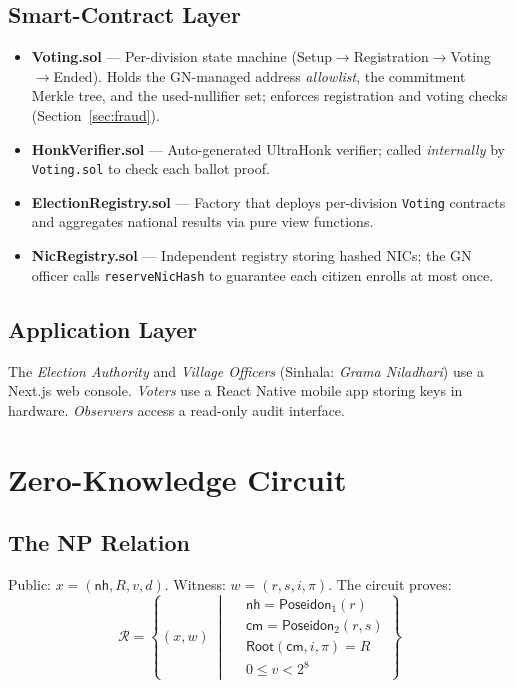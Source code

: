 \documentclass[conference]{IEEEtran}
\theoremstyle{definition}
\theoremstyle{plain}
\newcommand{\Poseidon}{\mathsf{Poseidon}}
\newcommand{\nullhash}{\mathsf{nh}}
\newcommand{\commit}{\mathsf{cm}}
\begin{document}
\subsection{Smart-Contract Layer}
\begin{itemize}[leftmargin=*,itemsep=2pt,topsep=3pt]
\item \textbf{Voting.sol} --- Per-division state machine (Setup$\to$Registration$\to$Voting$\to$Ended). Holds the GN-managed address \emph{allowlist}, the commitment Merkle tree, and the used-nullifier set; enforces registration and voting checks (Section~\ref{sec:fraud}).
\item \textbf{HonkVerifier.sol} --- Auto-generated UltraHonk verifier; called \emph{internally} by \texttt{Voting.sol} to check each ballot proof.
\item \textbf{ElectionRegistry.sol} --- Factory that deploys per-division \texttt{Voting} contracts and aggregates national results via pure view functions.
\item \textbf{NicRegistry.sol} --- Independent registry storing hashed NICs; the GN officer calls \texttt{reserveNicHash} to guarantee each citizen enrolls at most once.
\end{itemize}

\subsection{Application Layer}
The \emph{Election Authority} and \emph{Village Officers} (Sinhala: \emph{Grama Niladhari}) use a Next.js web console. \emph{Voters} use a React Native mobile app storing keys in hardware. \emph{Observers} access a read-only audit interface.

\section{Zero-Knowledge Circuit}

\subsection{The NP Relation}
Public: $x=(\nullhash,R,v,d)$. Witness: $w=(r,s,i,\pi)$. The circuit proves:
\begin{equation}
\mathcal{R}\!=\!\left\{(x,w)\;\middle|\;
\begin{aligned}
&\nullhash=\Poseidon_1(r)\\
&\commit=\Poseidon_2(r,s)\\
&\mathsf{Root}(\commit,i,\pi)=R\\
&0\le v<2^8
\end{aligned}\right\}
\label{eq:relation}
\end{equation}
\end{document}
